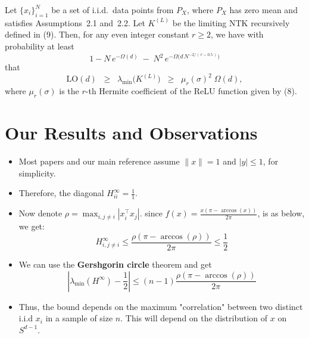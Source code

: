 \documentclass[serif, aspectratio=169]{beamer}
\begin{document}
\begin{frame}
	\begin{theorem}
		\label{thm:smallest-eig-NTK}
		Let $\{x_i\}_{i=1}^N$ be a set of i.i.d.\ data points from $P_X$, where $P_X$ has 
		zero mean and satisfies Assumptions~2.1 and~2.2. Let $K^{(L)}$ be the limiting 
		NTK recursively defined in (9). Then, for any even integer constant $r \ge 2$, 
		we have with probability at least 
		\[
		1 - N\,e^{-\Omega(d)} \;-\; N^2\,e^{-\Omega\bigl(d\,N^{-2/(\,r - 0.5\,)}\bigr)}
		\]
		that
		\[
		\mathrm{LO}(d) 
		\;\;\ge\;\;
		\lambda_{\min}\bigl(K^{(L)}\bigr) 
		\;\;\ge\;\;
		\mu_{r}(\sigma)^{2}\;\Omega(d),
		\]
		where $\mu_{r}(\sigma)$ is the $r$-th Hermite coefficient of the ReLU function 
		given by (8).
	\end{theorem}
\end{frame}


\section{Our Results and Observations}

\begin{frame}
\begin{itemize}
	  \item Most papers and our main reference assume \(\|x\|=1\) and \(|y|\leq 1\), for simplicity.
	
	\item Therefore, the diagonal \(H^\infty_{ii} = \frac{1}{1}\).
	\item Now denote \(\rho = \max_{i,j\neq i} |x_i^\top x_j| \). since \(f(x)=\frac{x(\pi-\arccos(x))}{2\pi}\), is as below, we get:
	\[
	H^\infty_{i,j\neq i} \leq \frac{\rho(\pi-\arccos(\rho))}{2\pi} \leq \frac{1}{2}
	\]
	\item We can use the \textbf{Gershgorin circle} theorem and get
	\[
	| \lambda_{\min}(H^\infty) - \frac{1}{2} | \leq (n-1)\frac{\rho(\pi-\arccos(\rho))}{2\pi}
	\]
	\item Thus, the bound depends on the maximum "correlation" between two distinct i.i.d \(x_i\) in a sample of size \(n\). This will depend on the distribution of \(x\) on \(S^{d-1}\).
\end{itemize}
\end{frame}
\end{document}
